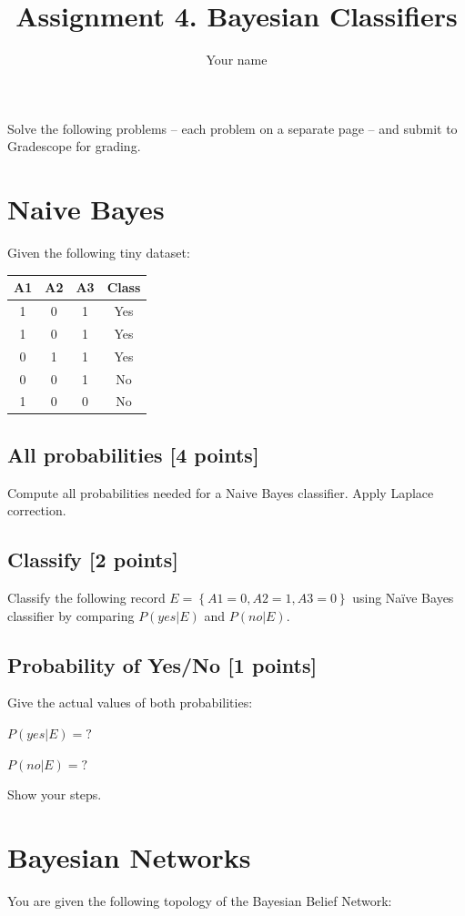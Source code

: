 \documentclass{article}
\title{Assignment 4. Bayesian Classifiers}
\author{Your name}
\begin{document}
\maketitle


Solve the following problems -- each problem on a separate page -- and submit to Gradescope for grading. 

\newpage
\section{Naive Bayes}
Given the following tiny dataset:

\begin{center}
\begin{tabular}{ |c|c|c|c| } 
 \hline
 A1 & A2 & A3 & Class \\
 \hline
1 & 0 & 1 & Yes \\ 
1 & 0 & 1 & Yes \\ 
0 & 1 & 1 & Yes \\ 
0 & 0 & 1 & No \\ 
1 & 0 & 0 & No \\ 
 \hline
\end{tabular}
\end{center}
\subsection {All probabilities [4 points]}
Compute all probabilities needed for a Naive Bayes classifier. Apply Laplace correction.
\subsection {Classify [2 points]}
Classify the following record $E=\left\{A1=0, A2=1, A3=0\right\}$ using Naïve Bayes classifier by comparing $P(yes|E)$ and $P(no|E)$.
\subsection {Probability of Yes/No [1 points]}
Give the actual values of both probabilities:

$P(yes|E) = ?$ 

$P(no| E) = ?$


Show your steps.

\newpage
\section{Bayesian Networks}
You are given the following topology of the Bayesian Belief Network:
\end{document}
